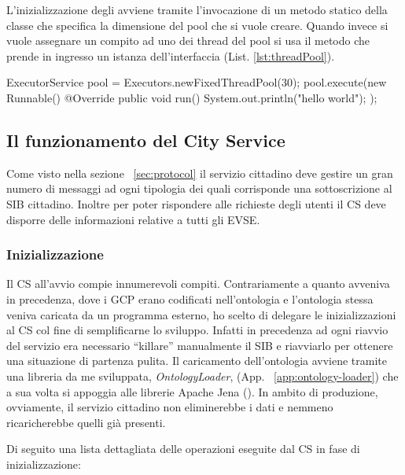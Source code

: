 L'inizializzazione degli  avviene tramite l'invocazione di un metodo statico della classe  che specifica la dimensione del pool che si vuole creare. Quando invece si vuole assegnare un compito ad uno dei thread del pool si usa il metodo  che prende in ingresso un istanza dell'interfaccia  (List. \ref{lst:threadPool}).

\begin{java}[caption={Creazione Pool di Thread},label={lst:threadPool}]
ExecutorService pool = Executors.newFixedThreadPool(30);
pool.execute(new Runnable() {
	@Override
	public void run() {
		System.out.println("hello world");
	}
});
\end{java}

\subsection{Il funzionamento del City Service}
 
Come visto nella sezione ~\ref{sec:protocol} il servizio cittadino deve gestire un gran numero di messaggi ad ogni tipologia dei quali corrisponde una sottoscrizione al SIB cittadino. Inoltre per poter rispondere alle richieste degli utenti il CS deve disporre delle informazioni relative a tutti gli EVSE.

\subsubsection{Inizializzazione}\label{subsubsec:city-init}

Il CS all'avvio compie innumerevoli compiti. Contrariamente a quanto avveniva in precedenza, dove i GCP erano codificati nell'ontologia e l'ontologia stessa veniva caricata da un programma esterno, ho scelto di delegare le inizializzazioni al CS col fine di semplificarne lo sviluppo. Infatti in precedenza ad ogni riavvio del servizio era necessario ``killare'' manualmente il SIB e riavviarlo per ottenere una situazione di partenza pulita. Il caricamento dell'ontologia avviene tramite una libreria da me sviluppata, \emph{OntologyLoader}, (App. ~\ref{app:ontology-loader}) che a sua volta si appoggia alle librerie Apache Jena (\cite{jena2011}). In ambito di produzione, ovviamente, il servizio cittadino non eliminerebbe i dati e nemmeno ricaricherebbe quelli già presenti.

Di seguito una lista dettagliata delle operazioni eseguite dal CS in fase di inizializzazione:

